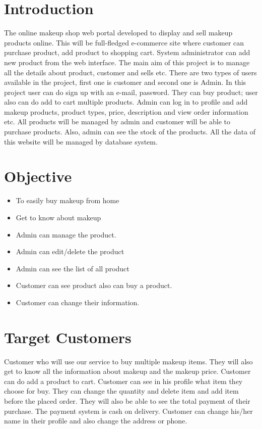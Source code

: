 \documentclass[12pt,letterpaper]{article}
\begin{document}
\section{Introduction}
The online makeup shop web portal developed to display and sell makeup products online. This will be full-fledged e-commerce site where customer can purchase product, add product to shopping cart. System administrator can add new product from the web interface. The main aim of this project is to manage all the details about product, customer and sells etc. There are two types of users available in the project, first one is customer and second one is Admin. In this project user can do sign up with an e-mail, password. They can buy product; user also can do add to cart multiple products. Admin can log in to profile and add makeup products, product types, price, description and view order information etc. All products will be managed by admin and customer will be able to purchase products. Also, admin can see the stock of the products. All the data of this website will be managed by database system.  

\hfill \break
\hfill \break

\section{Objective}
\begin{itemize}
 \item 	To easily buy makeup from home
 \item 	Get to know about makeup
 \item 	Admin can manage the product.
 \item	Admin can edit/delete the product
 \item Admin can see the list of all product
  \item	Customer can see product also can buy a product.
  \item	Customer can change their information.
\end{itemize}

\hfill \break

\section{Target Customers}
Customer who will use our service to buy multiple makeup items. They will also get to know all the information about makeup and the makeup price. Customer can do add a product to cart. Customer can see in his profile what item they choose for buy. They can change the quantity and delete item and add item before the placed order. They will also be able to see the total payment of their purchase. The payment system is cash on delivery. Customer can change his/her name in their profile and also change the address or phone.
\end{document}
